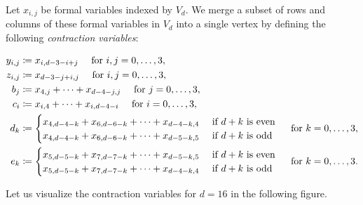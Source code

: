 \begin{definition}\label{def:contraction-variables}
Let \( x_{i,j} \) be formal variables indexed by \( V_d \). We merge a subset of rows and columns of these formal variables in \( V_d \) into a single vertex by defining the following \emph{contraction variables}:

\begin{align*}
    y_{i,j} &\coloneqq x_{i, d-3-i+j} \quad \text{ for } i,j = 0, \dots, 3, \\
    z_{i,j} &\coloneqq x_{d-3-j+i,j} \quad \text{ for } i,j = 0, \dots, 3, \\
    b_j &\coloneqq x_{4,j} + \dots + x_{d-4-j,j} \quad \text{ for } j = 0, \dots, 3, \\
    c_i &\coloneqq x_{i,4} + \dots + x_{i,d-4-i} \quad \text{ for } i = 0, \dots, 3, \\
    d_k &\coloneqq \begin{cases}
        x_{4,d-4-k} + x_{6,d-6-k} + \dots + x_{d-4-k,4} & \text{ if \( d + k \) is even} \\
        x_{4,d-4-k} + x_{6,d-6-k} + \dots + x_{d-5-k,5} & \text{ if \( d + k \) is odd}
    \end{cases} \quad \text{ for } k = 0, \dots, 3, \\
    e_k &\coloneqq \begin{cases}
        x_{5,d-5-k} + x_{7,d-7-k} + \dots + x_{d-5-k,5} & \text{ if \( d + k \) is even} \\
        x_{5,d-5-k} + x_{7,d-7-k} + \dots + x_{d-4-k,4} & \text{ if \( d + k \) is odd}
    \end{cases} \quad \text{ for } k = 0, \dots, 3.
\end{align*}
\end{definition}

Let us visualize the contraction variables for \( d = 16 \) in the following figure.

